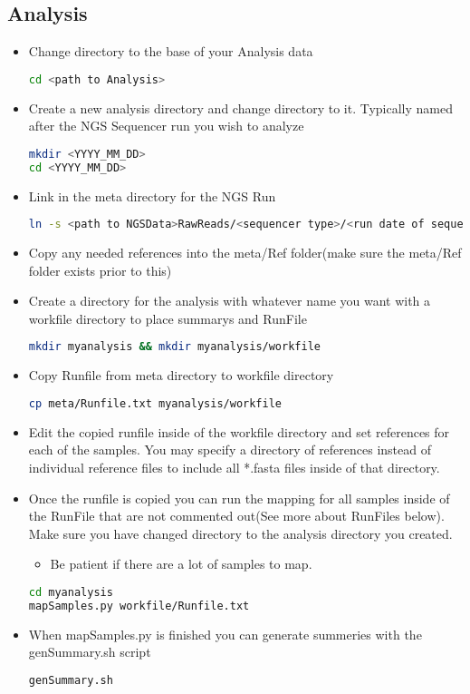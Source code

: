 \documentclass{article}
\begin{document}
\subsection{Analysis}
\begin{itemize}
\item Change directory to the base of your Analysis data
{\tiny
\begin{lstlisting}[language=bash]
cd <path to Analysis>
\end{lstlisting}
}
\item Create a new analysis directory and change directory to it. Typically named after the NGS Sequencer run you wish to analyze
{\tiny
\begin{lstlisting}[language=bash]
mkdir <YYYY_MM_DD>
cd <YYYY_MM_DD>
\end{lstlisting}
}
\item Link in the meta directory for the NGS Run
{\tiny
\begin{lstlisting}[language=bash]
ln -s <path to NGSData>RawReads/<sequencer type>/<run date of sequencer>/meta .
\end{lstlisting}
}
\item Copy any needed references into the meta/Ref folder(make sure the meta/Ref folder exists prior to this)
\item Create a directory for the analysis with whatever name you want with a workfile directory to place summarys and RunFile
{\tiny
\begin{lstlisting}[language=bash]
mkdir myanalysis && mkdir myanalysis/workfile
\end{lstlisting}
}
\item Copy Runfile from meta directory to workfile directory
{\tiny
\begin{lstlisting}[language=bash]
cp meta/Runfile.txt myanalysis/workfile
\end{lstlisting}
}
\item Edit the copied runfile inside of the workfile directory and set references for each of the samples. You may specify a directory of references instead of individual reference files to include all *.fasta files inside of that directory.
\item Once the runfile is copied you can run the mapping for all samples inside of the RunFile that are not commented out(See more about RunFiles below). Make sure you have changed directory to the analysis directory you created.
  \begin{itemize}
   \item Be patient if there are a lot of samples to map.
  \end{itemize}
{\tiny
\begin{lstlisting}[language=bash]
cd myanalysis
mapSamples.py workfile/Runfile.txt
\end{lstlisting}
}
\item When mapSamples.py is finished you can generate summeries with the genSummary.sh script
{\tiny
\begin{lstlisting}[language=bash]
genSummary.sh
\end{lstlisting}
}
\end{itemize}
\end{document}
